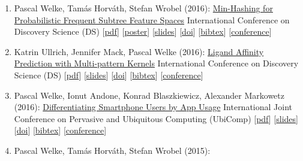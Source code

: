 \documentclass{scrartcl}
\begin{document}
\begin{enumerate}
{[\href{http://cci.drexel.edu/bigdata/bigdata2016/}{conference}]
}
\item
\label{welke2016ds}
Pascal Welke, Tamás Horváth, Stefan Wrobel (2016):\newline
\href{https://dx.doi.org/10.1007/978-3-319-46307-0_5}{Min-Hashing for Probabilistic Frequent Subtree Feature Spaces}\newline
International Conference on Discovery Science (DS)\newline
{\footnotesize
[\href{https://pwelke.de/publications/welke2016ds.pdf}{pdf}]
[\href{https://pwelke.de/publications/welke2016ds-poster.pdf}{poster}]
[\href{https://pwelke.de/publications/welke2016ds-slides.pdf}{slides}]
[\href{https://dx.doi.org/10.1007/978-3-319-46307-0_5}{doi}]
[\href{https://dblp.org/rec/conf/dis/WelkeHW16.bib}{bibtex}]
[\href{http://ds2016.di.uniba.it/}{conference}]
}
\item
\label{ullrich2016ds}
Katrin Ullrich, Jennifer Mack, Pascal Welke (2016):\newline
\href{https://dx.doi.org/10.1007/978-3-319-46307-0_30}{Ligand Affinity Prediction with Multi-pattern Kernels}\newline
International Conference on Discovery Science (DS)\newline
{\footnotesize
[\href{https://pwelke.de/publications/ullrich2016ds.pdf}{pdf}]
[\href{https://pwelke.de/publications/ullrich2016ds-slides.pdf}{slides}]
[\href{https://dx.doi.org/10.1007/978-3-319-46307-0_30}{doi}]
[\href{https://dblp.org/rec/conf/dis/UllrichMW16.bib}{bibtex}]
[\href{http://ds2016.di.uniba.it/}{conference}]
}
\item
\label{welke2016ubicomp}
Pascal Welke, Ionut Andone, Konrad Blaszkiewicz, Alexander Markowetz (2016):\newline
\href{https://dx.doi.org/10.1145/2971648.2971707}{Differentiating Smartphone Users by App Usage}\newline
International Joint Conference on Pervasive
and Ubiquitous Computing (UbiComp)\newline
{\footnotesize
[\href{https://pwelke.de/publications/welke2016ubicomp.pdf}{pdf}]
[\href{https://pwelke.de/publications/welke2016ubicomp-slides.pdf}{slides}]
[\href{https://dx.doi.org/10.1145/2971648.2971707}{doi}]
[\href{https://dblp.org/rec/conf/huc/WelkeABM16.bib}{bibtex}]
[\href{http://ubicomp.org/ubicomp2016/}{conference}]
}
\item
\label{welke2015nfmcp}
Pascal Welke, Tamás Horváth, Stefan Wrobel (2015):\newline

\end{enumerate}
\end{document}
